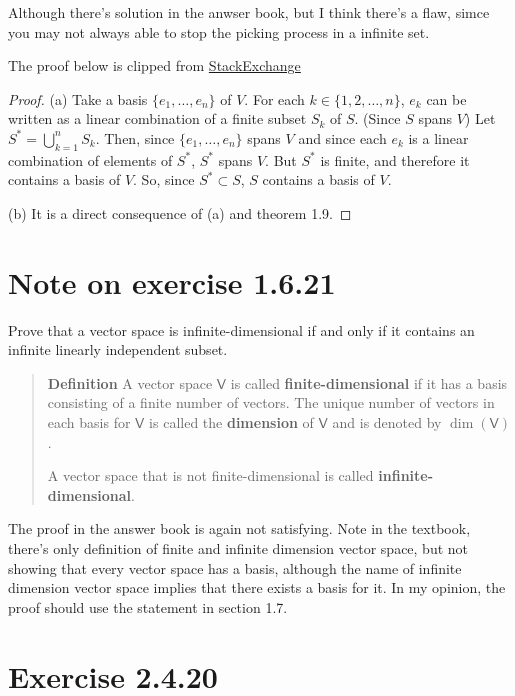\documentclass{article}
\newcommand{\0}{\mathit{0}}
\begin{document}
Although there's solution in the anwser book, but I think there's a flaw, simce you
may not always able to stop the picking process in a infinite set.

The proof below is clipped from \href{https://math.stackexchange.com/a/4762926/808819}{StackExchange}

\begin{proof}
    (a)
    Take a basis  $\{e_1,\ldots,e_n\}$ of $V$.
    For each $k\in\{1,2,\ldots,n\}$, $e_k$ can be written as a linear
    combination of a finite subset $S_k$ of $S$. (Since $S$ spans $V$)
    Let $S^\ast=\bigcup_{k=1}^nS_k$.
    Then, since $\{e_1,\ldots,e_n\}$ spans $V$ and
    since each $e_k$ is a linear combination of elements of $S^\ast$,
    $S^\ast$ spans $V$. But $S^\ast$ is finite, and therefore it contains a basis of $V$.
    So, since $S^\ast\subset S$, $S$ contains a basis of $V$.

    (b) It is a direct consequence of (a) and theorem 1.9.
\end{proof}

\section{Note on exercise 1.6.21}
Prove that a vector space is infinite-dimensional if and only if it contains
an infinite linearly independent subset.

\begin{quotation}
    \textbf{Definition}
    A vector space $\mathsf{V}$ is called \textbf{finite-dimensional} if it has a basis
    consisting of a finite number of vectors. The unique number of vectors in each
    basis for $\mathsf{V}$ is called the \textbf{dimension} of $\mathsf{V}$ and is denoted
    by $\dim(\mathsf{V})$.

    A vector space that is not finite-dimensional is called \textbf{infinite-dimensional}.
\end{quotation}

The proof in the answer book is again not satisfying. Note in the textbook, there's only
definition of finite and infinite dimension vector space, but not showing that every vector
space has a basis, although the name of infinite dimension vector space implies that
there exists a basis for it. In my opinion, the proof should use the statement in section 1.7.



\section{Exercise 2.4.20}
\end{document}
